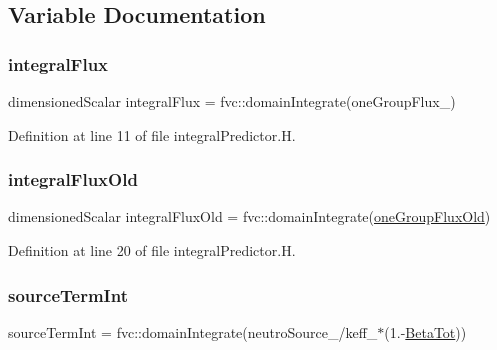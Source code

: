 \subsection{Variable Documentation}
\mbox{\label{integralPredictor_8H_a2a0b08b13037e807e2dd9a5db5f493fa}} 
\subsubsection{\texorpdfstring{integral\+Flux}{integralFlux}}
{\footnotesize\ttfamily dimensioned\+Scalar integral\+Flux = fvc\+::domain\+Integrate(one\+Group\+Flux\+\_\+)}



Definition at line 11 of file integral\+Predictor.\+H.

\mbox{\label{integralPredictor_8H_a96a9327735ca0a4dbb1ca5b12a8f209a}} 
\subsubsection{\texorpdfstring{integral\+Flux\+Old}{integralFluxOld}}
{\footnotesize\ttfamily dimensioned\+Scalar integral\+Flux\+Old = fvc\+::domain\+Integrate(\hyperlink{integralPredictorSP3_8H_a34c5d9843ad8c67cedc393b8b7e6d3a0}{one\+Group\+Flux\+Old})}



Definition at line 20 of file integral\+Predictor.\+H.

\mbox{\label{integralPredictor_8H_aa5ae446f24d87e14d8bd4df6d043998e}} 
\subsubsection{\texorpdfstring{source\+Term\+Int}{sourceTermInt}}
{\footnotesize\ttfamily source\+Term\+Int = fvc\+::domain\+Integrate(neutro\+Source\+\_\+/keff\+\_\+$\ast$(1.-\/\hyperlink{setXSFieldsSN_8H_a3ad4facb2dd0406d605dcb63190ce6f1}{Beta\+Tot}))}




